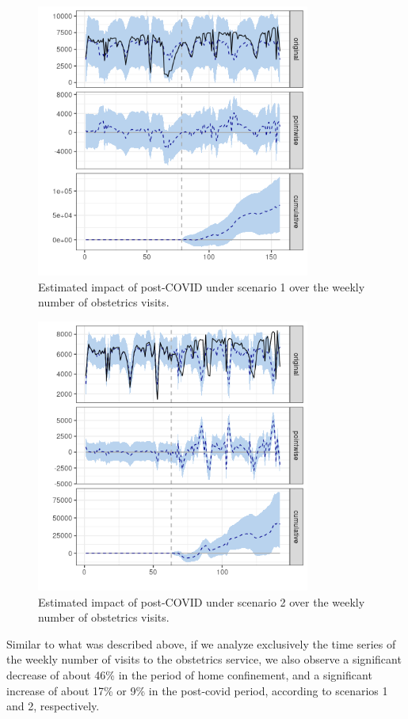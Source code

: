 \documentclass[9pt]{osa-supplemental-document}
\begin{document}
\begin{center}
\begin{figure}[H]
\includegraphics[width=9cm]{obstetrics_post_scen1.png}\caption{Estimated impact of post-COVID under scenario 1 over the weekly number of obstetrics visits.}
\end{figure}
\end{center}

\begin{center}
  \begin{figure}[H]
    \includegraphics[width=9cm]{obstetrics_post_scen2.png}\caption{Estimated impact of post-COVID under scenario 2 over the weekly number of obstetrics visits.}
  \end{figure}
  \end{center}

Similar to what was described above, if we analyze exclusively the time series of the weekly number of visits to the obstetrics service, we also observe a significant decrease of about 46\% in the period of home confinement, and a significant increase of about 17\% or 9\% in the post-covid period, according to scenarios 1 and 2, respectively. 
\end{document}
